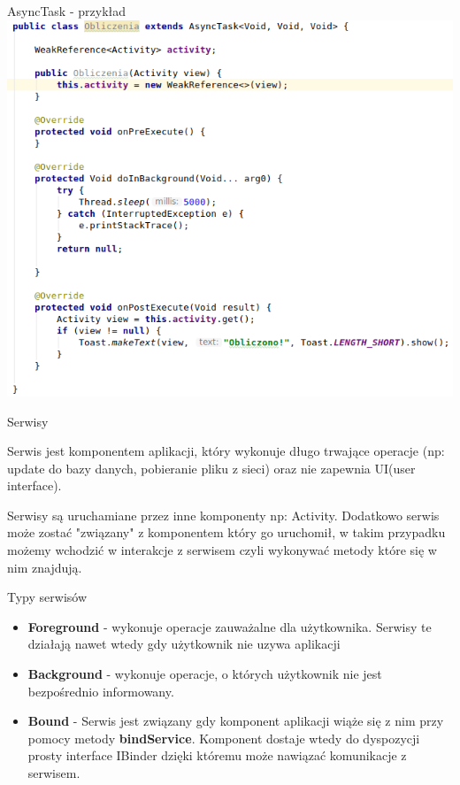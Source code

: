 \documentclass{beamer}
\begin{document}
\begin{frame}{AsyncTask - przykład}
	\centering
	\includegraphics[height=0.8\textheight]{asynctask}
\end{frame}

\begin{frame}{Serwisy}
	\begin{block}{}
		Serwis jest komponentem aplikacji, który wykonuje długo trwające operacje (np: update do bazy danych, pobieranie pliku z sieci) oraz nie zapewnia UI(user interface).
		
		Serwisy są uruchamiane przez inne komponenty np: Activity. Dodatkowo serwis może zostać "związany" z komponentem który go uruchomił, w takim przypadku możemy wchodzić w interakcje z serwisem czyli wykonywać metody które się w nim znajdują.
	\end{block}
\end{frame}

\begin{frame}{Typy serwisów}
	\begin{itemize}
		\item \textbf{Foreground} - wykonuje operacje zauważalne dla użytkownika. Serwisy te działają nawet wtedy gdy użytkownik nie uzywa aplikacji
		\item \textbf{Background} - wykonuje operacje, o których użytkownik nie jest bezpośrednio informowany.
		\item \textbf{Bound} - Serwis jest związany gdy komponent aplikacji wiąże się z nim przy pomocy metody \textbf{bindService}. Komponent dostaje wtedy do dyspozycji prosty interface IBinder dzięki któremu może nawiązać komunikacje z serwisem.
	\end{itemize}
\end{frame}
\end{document}
